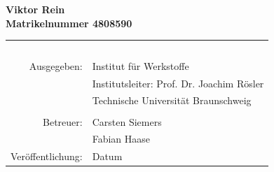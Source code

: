 \begin{titlepage}
 \textbf{\large Viktor Rein} \\[0.5ex]
 \textbf{Matrikelnummer 4808590}
 

 

 



 \vspace*{2.5cm}

 \begin{table}[htbp]
  \begin{center}
   \begin{tabular}{rl} 
     \parbox{0.33\textwidth}{\mbox{ }} & \parbox{0.66\textwidth}{\mbox{ }} \\
     Ausgegeben: & Institut für Werkstoffe \\
                 & Institutsleiter: Prof. Dr. Joachim Rösler \\
                 & Technische Universit\"at Braunschweig \\
                 &  \\
       Betreuer: & Carsten Siemers\\
       			 & Fabian Haase\\
 Ver\"offentlichung: & Datum \\
   \end{tabular}
  \end{center}
 \end{table}



\end{titlepage}

